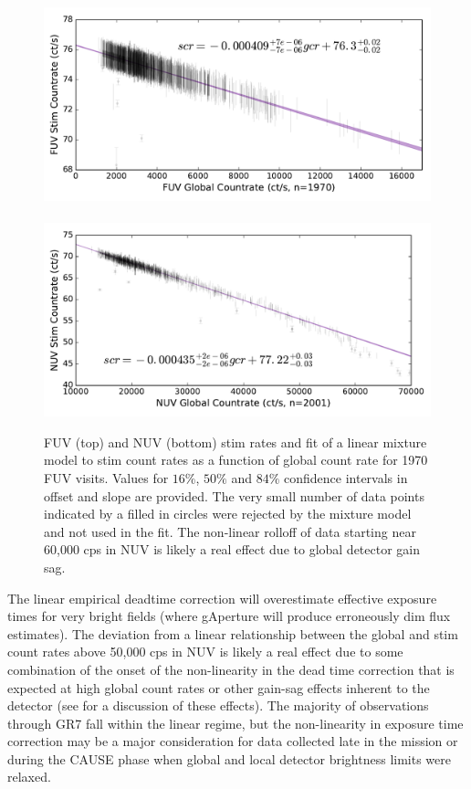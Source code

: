 \documentclass[preprint]{aastex}
\begin{document}
\clearpage
\begin{figure}[h]
\includegraphics[scale=0.75]{Fig10a.pdf}\\\\
\includegraphics[scale=0.75]{Fig10b.pdf}
\caption{FUV (top) and NUV (bottom) stim rates and fit of a linear mixture model to stim count rates as a function of global count rate for 1970 FUV visits. Values for $16\%$, $50\%$ and $84\%$ confidence intervals in offset and slope are provided. The very small number of data points indicated by a filled in circles were rejected by the mixture model and not used in the fit. The non-linear rolloff of data starting near 60,000 cps in NUV is likely a real effect due to global detector gain sag.
\label{stim}}
\end{figure}
\clearpage

The linear empirical deadtime correction will overestimate effective exposure times for very bright fields (where gAperture will produce erroneously dim flux estimates). The deviation from a linear relationship between the global and stim count rates above 50,000 cps in NUV is likely a real effect due to some combination of the onset of the non-linearity in the dead time correction that is expected at high global count rates or other gain-sag effects inherent to the detector (see \citep{mor2007} for a discussion of these effects). The majority of observations through GR7 fall within the linear regime, but the non-linearity in exposure time correction may be a major consideration for data collected late in the mission or during the CAUSE phase when global and local detector brightness limits were relaxed.
\end{document}

